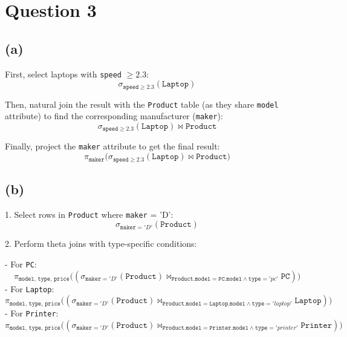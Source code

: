 \documentclass{article}
\begin{document}
\newpage
\section*{Question 3}
\subsection*{(a)}
First, select laptops with \texttt{speed} $\geq 2.3$:
$$
    \sigma_{\texttt{speed} \geq 2.3}(\texttt{Laptop})
$$

Then, natural join the result with the \texttt{Product} table (as they share \texttt{model} attribute) to find the corresponding manufacturer (\texttt{maker}):
$$
    \sigma_{\texttt{speed} \geq 2.3}(\texttt{Laptop}) \bowtie \texttt{Product}
$$

Finally, project the \texttt{maker} attribute to get the final result:
$$
    \pi_{\texttt{maker}} \bigg( \sigma_{\texttt{speed} \geq 2.3}(\texttt{Laptop}) \bowtie\texttt{Product} \bigg)
$$

\subsection*{(b)}
1. Select rows in \texttt{Product} where \texttt{maker} = 'D':
$$
    \sigma_{\texttt{maker} = 'D'}(\texttt{Product})
$$

2. Perform theta joins with type-specific conditions:

- For \texttt{PC}:
$$
    \pi_{\texttt{model, type, price}} \Big(
    (\sigma_{\texttt{maker} = 'D'}(\texttt{Product}) \bowtie_{\texttt{Product.model} = \texttt{PC.model} \land \texttt{type} = 'pc'} \texttt{PC})
    \Big)
$$
- For \texttt{Laptop}:
$$
    \pi_{\texttt{model, type, price}} \Big(
    (\sigma_{\texttt{maker} = 'D'}(\texttt{Product}) \bowtie_{\texttt{Product.model} = \texttt{Laptop.model} \land \texttt{type} = 'laptop'} \texttt{Laptop})
    \Big)
$$
- For \texttt{Printer}:
$$
    \pi_{\texttt{model, type, price}} \Big(
    (\sigma_{\texttt{maker} = 'D'}(\texttt{Product}) \bowtie_{\texttt{Product.model} = \texttt{Printer.model} \land \texttt{type} = 'printer'} \texttt{Printer})
    \Big)
$$
\end{document}
